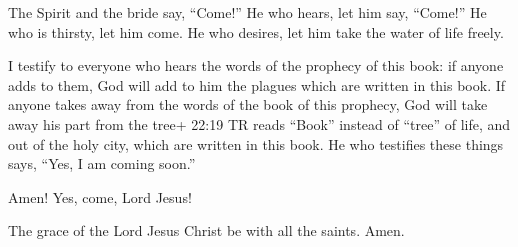  The Spirit and the bride say, ``Come!'' He who hears, let
him say, ``Come!'' He who is thirsty, let him come. He who desires, let
him take the water of life freely.

 I testify to everyone who hears the words of the prophecy
of this book: if anyone adds to them, God will add to him the plagues
which are written in this book.  If anyone takes away from
the words of the book of this prophecy, God will take away his part from
the tree+ 22:19 TR reads ``Book'' instead of ``tree'' of life, and out
of the holy city, which are written in this book.  He who
testifies these things says, ``Yes, I am coming soon.''

Amen! Yes, come, Lord Jesus!

 The grace of the Lord Jesus Christ be with all the saints.
Amen.
